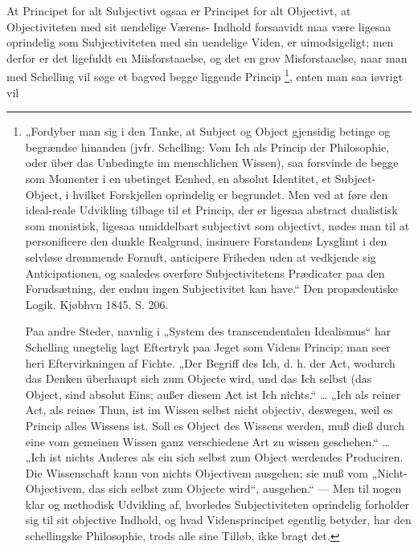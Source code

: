 \documentclass[11pt]{book}
\newcommand{\opage}[1]{\marginnote{\footnotesize\textit{[#1]}}}
\begin{document}
At Principet for alt Subjectivt ogsaa er Principet for alt Objectivt,
at Objectiviteten med sit uendelige Værens-%
\opage{9} \setcounter{footnote}{0}%
Indhold forsaavidt maa være ligesaa oprindelig som Subjectiviteten med
sin uendelige Viden, er uimodsigeligt; men derfor er det ligefuldt en
Miisforstaaelse, og det en grov Misforstaaelse, naar man med Schelling
vil søge et bagved begge liggende Princip%
\footnote{„Fordyber man sig i den Tanke, at Subject og Object gjensidig
betinge og begrændse hinanden (jvfr. Schelling: Vom Ich als Princip der
Philosophie, oder über das Unbedingte im menschlichen Wissen), saa
forsvinde de begge som Momenter i en ubetinget Eenhed, en absolut
Identitet, et Subject-Object, i hvilket Forskjellen oprindelig er
begrundet. Men ved at føre den ideal-reale Udvikling tilbage til et
Princip, der er ligesaa abstract dualistisk som monistisk, ligesaa
umiddelbart subjectivt som objectivt, nødes man til at personificere
den dunkle Realgrund, insinuere Forstandens Lysglimt i den selvløse
drømmende Fornuft, anticipere Friheden uden at vedkjende sig
Anticipationen, og saaledes overføre Subjectivitetens Prædicater paa
den Forudsætning, der endnu ingen Subjectivitet kan have.“ Den
propædeutiske Logik. Kjøbhvn 1845. S. 206.\par
Paa andre Steder, navnlig i „System des transcendentalen Idealismus“
har Schelling unegtelig lagt Eftertryk paa Jeget som Videns Princip;
man seer heri Eftervirkningen af Fichte. „Der Begriff des Ich, d. h.
der Act, wodurch das Denken überhaupt sich zum Objecte wird, und das
Ich selbst (das Object, sind absolut Eins; außer diesem Act ist Ich
nichts.“ \ldots{} „Ich als reiner Act, als reines Thun, ist im Wissen
selbst nicht objectiv, deswegen, weil es Princip alles Wissens ist.
Soll es Object des Wissens werden, muß dieß durch eine vom gemeinen
Wissen ganz verschiedene Art zu wissen geschehen.“ \ldots{} „Ich ist
nichts Anderes als ein sich selbst zum Object werdendes Produciren.
Die Wissenschaft kann von nichts Objectivem ausgehen; sie muß vom
„Nicht-Objectivem, das sich selbst zum Objecte wird“, ausgehen.“ ---
Men til nogen klar og methodisk Udvikling af, hvorledes Subjectiviteten
oprindelig forholder sig til sit objective Indhold, og hvad
Vidensprincipet egentlig betyder, har den schellingske Philosophie,
trods alle sine Tilløb, ikke bragt det.}, enten man saa iøvrigt vil
\end{document}
